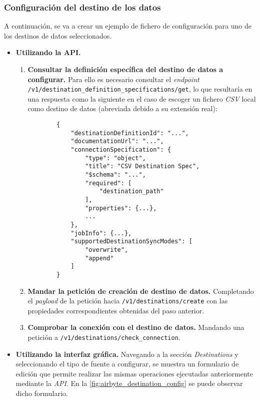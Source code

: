 \subsubsection{Configuración del destino de los datos}

A continuación, se va a crear un ejemplo de fichero de configuración para uno de los destinos de datos seleccionados.

\begin{itemize}
    
    \item \textbf{Utilizando la API.}
    
    \begin{enumerate}
        
        \item \textbf{Consultar la definición específica del destino de datos a configurar.} Para ello es necesario consultar el \textit{endpoint} \\ \verb|/v1/destination_definition_specifications/get|, lo que resultaría en una respuesta como la siguiente en el caso de escoger un fichero \textit{CSV} local como destino de datos (abreviada debido a su extensión real):

        \begin{verbatim}
        {
            "destinationDefinitionId": "...",
            "documentationUrl": "...",
            "connectionSpecification": {
                "type": "object",
                "title": "CSV Destination Spec",
                "$schema": "...",
                "required": [
                    "destination_path"
                ],
                "properties": {...},
                ...
            },
            "jobInfo": {...},
            "supportedDestinationSyncModes": [
                "overwrite",
                "append"
            ]
        }
        \end{verbatim}
        
        \item \textbf{Mandar la petición de creación de destino de datos.} Completando el \textit{payload} de la petición hacia \verb|/v1/destinations/create| con las propiedades correspondientes obtenidas del paso anterior. 
        
        \item \textbf{Comprobar la conexión con el destino de datos.} Mandando una petición a \verb|/v1/destinations/check_connection|.
    
    \end{enumerate}
    
    \item \textbf{Utilizando la interfaz gráfica.} Navegando a la sección \textit{Destinations} y seleccionando el tipo de fuente a configurar, se muestra un formulario de edición que permite realizar las mismas operaciones ejecutadas anteriormente mediante la \textit{API}. En la \autoref{fig:airbyte_destination_config} se puede observar dicho formulario.

    
\end{itemize}

